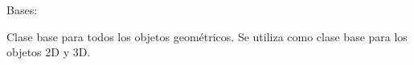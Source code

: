 \documentclass[letterpaper,10pt,spanish]{sphinxmanual}
\begin{document}

\begin{fulllineitems}
\label{\detokenize{pr8:pr8.4.ObjetoGeometrico}}
\pysigstartsignatures
{}
\pysigstopsignatures
\sphinxAtStartPar
Bases: 

\sphinxAtStartPar
Clase base para todos los objetos geométricos.
Se utiliza como clase base para los objetos 2D y 3D.

\end{fulllineitems}

\end{document}
